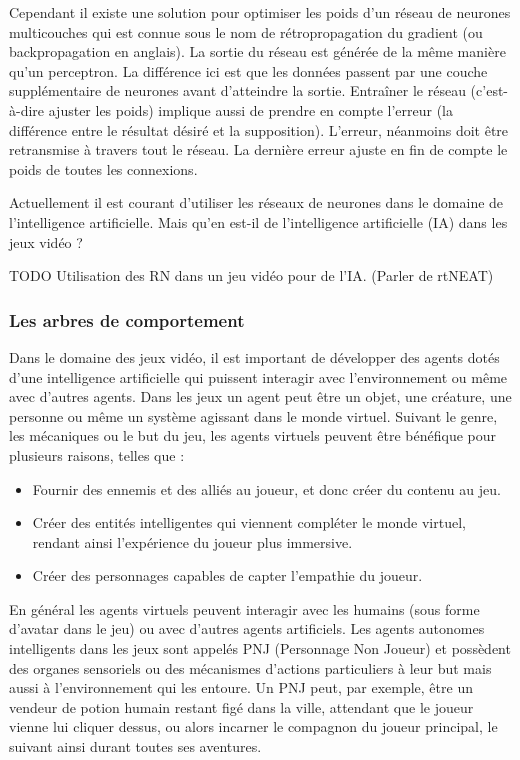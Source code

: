 \documentclass[a4paper, 12pt]{article} %
\begin{document}
Cependant il existe une solution pour optimiser les poids d’un réseau de neurones multicouches qui est connue sous le nom de rétropropagation du gradient (ou backpropagation en anglais). La sortie du réseau est générée de la même manière qu’un perceptron. La différence ici est que les données passent par une couche supplémentaire de neurones avant d’atteindre la sortie. Entraîner le réseau (c’est-à-dire ajuster les poids) implique aussi de prendre en compte l’erreur (la différence entre le résultat désiré et la supposition). L’erreur, néanmoins doit être retransmise à travers tout le réseau. La dernière erreur ajuste en fin de compte le poids de toutes les connexions.

Actuellement il est courant d’utiliser les réseaux de neurones dans le domaine de l’intelligence artificielle. Mais qu’en est-il de l’intelligence artificielle (IA) dans les jeux vidéo ?

TODO Utilisation des RN dans un jeu vidéo pour de l’IA. (Parler de rtNEAT)

\newpage
\subsubsection{Les arbres de comportement}

Dans le domaine des jeux vidéo, il est important de développer des agents dotés d’une intelligence artificielle qui puissent interagir avec l’environnement ou même avec d’autres agents. Dans les jeux un agent peut être un objet, une créature, une personne ou même un système agissant dans le monde virtuel. Suivant le genre, les mécaniques ou le but du jeu, les agents virtuels peuvent être bénéfique pour plusieurs raisons, telles que :

\begin{itemize}
	\item Fournir des ennemis et des alliés au joueur, et donc créer du contenu au jeu.
	\item Créer des entités intelligentes qui viennent compléter le monde virtuel, rendant ainsi l’expérience du joueur plus immersive.
	\item Créer des personnages capables de capter l’empathie du joueur.
\end{itemize}

En général les agents virtuels peuvent interagir avec les humains (sous forme d’avatar dans le jeu) ou avec d’autres agents artificiels. Les agents autonomes intelligents dans les jeux sont appelés PNJ (Personnage Non Joueur) et possèdent des organes sensoriels ou des mécanismes d’actions particuliers à leur but mais aussi à l’environnement qui les entoure. Un PNJ peut, par exemple, être un vendeur de potion humain restant figé dans la ville, attendant que le joueur vienne lui cliquer dessus, ou alors incarner le compagnon du joueur principal, le suivant ainsi durant toutes ses aventures.
\end{document}
